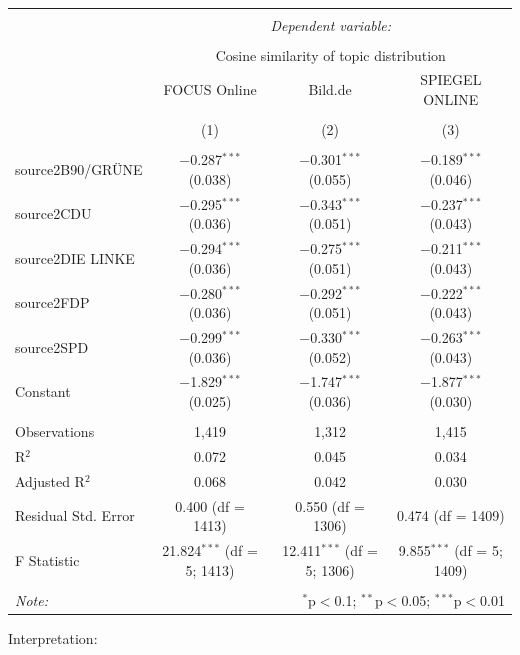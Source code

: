 \documentclass[
]{article}
\begin{document}
\begin{table}[!htbp] \centering 
  \caption{} 
  \label{} 
\tiny 
\begin{tabular}{@{\extracolsep{5pt}}lccc} 
\\[-1.8ex]\hline 
\hline \\[-1.8ex] 
 & \multicolumn{3}{c}{\textit{Dependent variable:}} \\ 
\cline{2-4} 
\\[-1.8ex] & \multicolumn{3}{c}{Cosine similarity of topic distribution} \\ 
 & FOCUS Online & Bild.de & SPIEGEL ONLINE \\ 
\\[-1.8ex] & (1) & (2) & (3)\\ 
\hline \\[-1.8ex] 
 source2B90/GRÜNE & $-$0.287$^{***}$ (0.038) & $-$0.301$^{***}$ (0.055) & $-$0.189$^{***}$ (0.046) \\ 
  source2CDU & $-$0.295$^{***}$ (0.036) & $-$0.343$^{***}$ (0.051) & $-$0.237$^{***}$ (0.043) \\ 
  source2DIE LINKE & $-$0.294$^{***}$ (0.036) & $-$0.275$^{***}$ (0.051) & $-$0.211$^{***}$ (0.043) \\ 
  source2FDP & $-$0.280$^{***}$ (0.036) & $-$0.292$^{***}$ (0.051) & $-$0.222$^{***}$ (0.043) \\ 
  source2SPD & $-$0.299$^{***}$ (0.036) & $-$0.330$^{***}$ (0.052) & $-$0.263$^{***}$ (0.043) \\ 
  Constant & $-$1.829$^{***}$ (0.025) & $-$1.747$^{***}$ (0.036) & $-$1.877$^{***}$ (0.030) \\ 
 \hline \\[-1.8ex] 
Observations & 1,419 & 1,312 & 1,415 \\ 
R$^{2}$ & 0.072 & 0.045 & 0.034 \\ 
Adjusted R$^{2}$ & 0.068 & 0.042 & 0.030 \\ 
Residual Std. Error & 0.400 (df = 1413) & 0.550 (df = 1306) & 0.474 (df = 1409) \\ 
F Statistic & 21.824$^{***}$ (df = 5; 1413) & 12.411$^{***}$ (df = 5; 1306) & 9.855$^{***}$ (df = 5; 1409) \\ 
\hline 
\hline \\[-1.8ex] 
\textit{Note:}  & \multicolumn{3}{r}{$^{*}$p$<$0.1; $^{**}$p$<$0.05; $^{***}$p$<$0.01} \\ 
\end{tabular} 
\end{table}

Interpretation:
\end{document}
